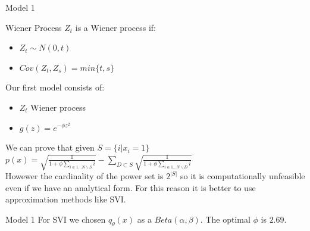 \documentclass{beamer}
\begin{document}
\begin{frame}{Model 1}
\begin{block}{Wiener Process}
$Z_{t}$ is a Wiener process if:
\begin{itemize}
\item$Z_{t}\sim N(0,t)$
\item $Cov(Z_{t},Z_{s})=min\{t,s\}$
\end{itemize} 
\end{block}
Our first model consists of:
\begin{itemize}
\item $Z_{t}$ Wiener process
\item $g(z)=e^{-\phi z^{2}}$  
\end{itemize}
We can prove that given $S=\{ i | x_{i}=1\}$ $p(x)=\sqrt{\frac{1}{1+\phi\sum\limits_{i \in 1...N \backslash S} i}}-\sum \limits _{D\subset S} \sqrt{\frac{1}{1+\phi\sum \limits_{i \in 1...N \backslash D} i}}$
\\Howewer the cardinality of the power set is $2^{|S|}$ so it is computationally unfeasible even if we have an analytical form. For this reason it is better to use approximation methods like SVI.
\end{frame}
\begin{frame}{Model 1}
For SVI we chosen $q_{\theta}(x)$ as a $Beta(\alpha,\beta)$.  The optimal $\phi$ is $2.69$.
\end{frame}
\end{document}
